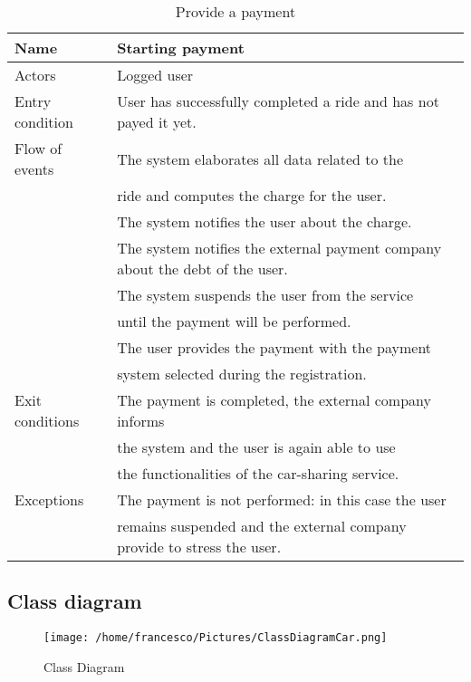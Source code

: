 \documentclass[10pt, a4paper,titlepage]{article}
\begin{document}
\begin{table}[!t]
\caption{Provide a payment} \label{tab:scenario13}
\begin{tabular}{|l|l|}
\hline
Name & Starting payment\\
\hline
Actors & Logged user\\ 
\hline
Entry condition & User has successfully completed a ride and has not payed it yet.\\
\hline
Flow of events & The system elaborates all data related to the\\
& ride and computes the charge for the user.\\
& The system notifies the user about the charge.\\
& The system notifies the external payment company about the debt of the user.\\
& The system suspends the user from the service\\
& until the payment will be performed.\\
& The user provides the payment with the payment \\
& system selected during the registration.\\
\hline
Exit conditions & The payment is completed, the external company informs\\
& the system and the user is again able to use \\
& the functionalities of the car-sharing service.\\
\hline
Exceptions & The payment is not performed: in this case the user\\
& remains suspended and the external company provide to stress the user.\\
\hline
\end{tabular}
\end{table}
\clearpage
\subsection{Class diagram}
\begin{figure}[!h]
\texttt{[image: /home/francesco/Pictures/ClassDiagramCar.png]}
\caption{Class Diagram}
\label{fig:Class Diagram}
\end{figure}
\clearpage
\end{document}
